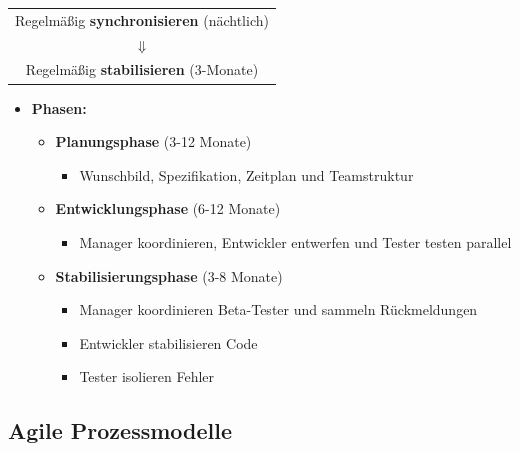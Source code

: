 \begin{itemize}
\begin{center}
\begin{tabular}{c}
				Regelmäßig \textbf{synchronisieren} (nächtlich) \\
				$\Downarrow$ \\
				Regelmäßig \textbf{stabilisieren} (3-Monate) \\
			\end{tabular}
		\end{center}			
		\newpage
		\begin{itemize}			
			\item \textbf{Phasen:}
			\begin{itemize}
				\item \textbf{Planungsphase} (3-12 Monate)
				\begin{itemize}
					\item Wunschbild, Spezifikation, Zeitplan und Teamstruktur
				\end{itemize}
				\item \textbf{Entwicklungsphase} (6-12 Monate)
				\begin{itemize}
					\item Manager koordinieren, Entwickler entwerfen und Tester testen parallel
				\end{itemize}
				\item \textbf{Stabilisierungsphase} (3-8 Monate)
				\begin{itemize}
					\item Manager koordinieren Beta-Tester und sammeln Rückmeldungen
					\item Entwickler stabilisieren Code
					\item Tester isolieren Fehler
				\end{itemize}
			\end{itemize}
		\end{itemize}
	\end{itemize}				
	\begin{center}
	\end{center}
		
	\subsection{Agile Prozessmodelle}
		
